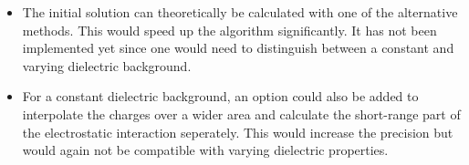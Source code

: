 \begin{itemize}
\item The initial solution can theoretically be calculated with one of the alternative methods. This would speed up the algorithm significantly. It has not been implemented yet since one would need to distinguish between a constant and varying dielectric background.
\item For a constant dielectric background, an option could also be added to interpolate the charges over a wider area and calculate the short-range part of the electrostatic interaction seperately. This would increase the precision but would again not be compatible with varying dielectric properties.
\end{itemize}



